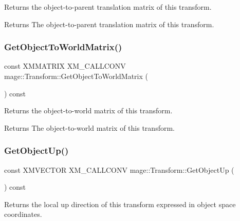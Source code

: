 Returns the object-\/to-\/parent translation matrix of this transform.

\begin{DoxyReturn}{Returns}
The object-\/to-\/parent translation matrix of this transform. 
\end{DoxyReturn}
\hypertarget{classmage_1_1_transform_af26e8771a10357032391a0a5f88a56fb}{}\label{classmage_1_1_transform_af26e8771a10357032391a0a5f88a56fb} 
\subsubsection{\texorpdfstring{Get\+Object\+To\+World\+Matrix()}{GetObjectToWorldMatrix()}}
{\footnotesize\ttfamily const X\+M\+M\+A\+T\+R\+IX X\+M\+\_\+\+C\+A\+L\+L\+C\+O\+NV mage\+::\+Transform\+::\+Get\+Object\+To\+World\+Matrix (\begin{DoxyParamCaption}{ }\end{DoxyParamCaption}) const\hspace{0.3cm}{\ttfamily [noexcept]}}

Returns the object-\/to-\/world matrix of this transform.

\begin{DoxyReturn}{Returns}
The object-\/to-\/world matrix of this transform. 
\end{DoxyReturn}
\hypertarget{classmage_1_1_transform_a283898f735e7b4be4bfbb5df2a216f53}{}\label{classmage_1_1_transform_a283898f735e7b4be4bfbb5df2a216f53} 
\subsubsection{\texorpdfstring{Get\+Object\+Up()}{GetObjectUp()}}
{\footnotesize\ttfamily const X\+M\+V\+E\+C\+T\+OR X\+M\+\_\+\+C\+A\+L\+L\+C\+O\+NV mage\+::\+Transform\+::\+Get\+Object\+Up (\begin{DoxyParamCaption}{ }\end{DoxyParamCaption}) const\hspace{0.3cm}{\ttfamily [noexcept]}}

Returns the local up direction of this transform expressed in object space coordinates.

